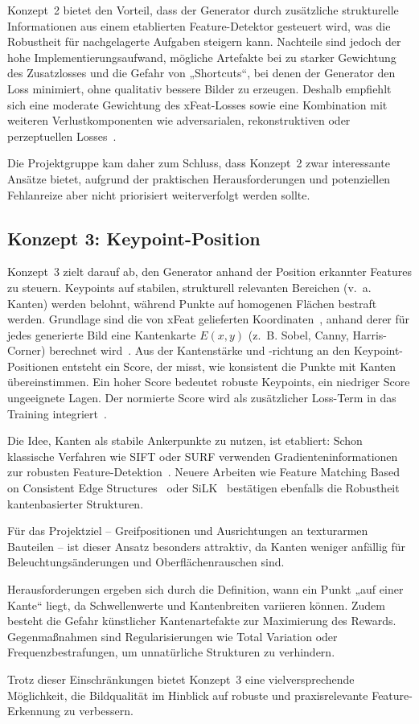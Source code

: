 Konzept~2 bietet den Vorteil, dass der Generator durch zusätzliche strukturelle Informationen aus einem etablierten Feature-Detektor gesteuert wird, was die Robustheit für nachgelagerte Aufgaben steigern kann. 
Nachteile sind jedoch der hohe Implementierungsaufwand, mögliche Artefakte bei zu starker Gewichtung des Zusatzlosses und die Gefahr von „Shortcuts“, bei denen der Generator den Loss minimiert, ohne qualitativ bessere Bilder zu erzeugen. 
Deshalb empfiehlt sich eine moderate Gewichtung des \ac{xFeat}-Losses sowie eine Kombination mit weiteren Verlustkomponenten wie adversarialen, rekonstruktiven oder perzeptuellen Losses~\cite{goodfellow2014gan,isola2018Pix2Pix}.  

Die Projektgruppe kam daher zum Schluss, dass Konzept~2 zwar interessante Ansätze bietet, aufgrund der praktischen Herausforderungen und potenziellen Fehlanreize aber nicht priorisiert weiterverfolgt werden sollte.

\subsection{Konzept 3: Keypoint-Position}
\label{sec:Konzept3}
Konzept~3 zielt darauf ab, den Generator anhand der Position erkannter Features zu steuern. 
Keypoints auf stabilen, strukturell relevanten Bereichen (v.~a. Kanten) werden belohnt, während Punkte auf homogenen Flächen bestraft werden. 
Grundlage sind die von \ac{xFeat} gelieferten Koordinaten~\cite{potje2024xfeat}, anhand derer für jedes generierte Bild eine Kantenkarte $E(x,y)$ (z.~B. Sobel, Canny, Harris-Corner) berechnet wird~\cite{szeliski2022}. 
Aus der Kantenstärke und -richtung an den Keypoint-Positionen entsteht ein Score, der misst, wie konsistent die Punkte mit Kanten übereinstimmen. 
Ein hoher Score bedeutet robuste Keypoints, ein niedriger Score ungeeignete Lagen. 
Der normierte Score wird als zusätzlicher Loss-Term in das Training integriert~\cite{chaumette2006visual,chaumette2007visual}.  

Die Idee, Kanten als stabile Ankerpunkte zu nutzen, ist etabliert: 
Schon klassische Verfahren wie \ac{SIFT} oder \ac{SURF} verwenden Gradienteninformationen zur robusten Feature-Detektion~\cite{lowe2004distinctive,bay2006surf}. 
Neuere Arbeiten wie Feature Matching Based on Consistent Edge Structures~\cite{mdpi2020edge} oder SiLK~\cite{gleize2023silk} bestätigen ebenfalls die Robustheit kantenbasierter Strukturen.  

Für das Projektziel – Greifpositionen und Ausrichtungen an texturarmen Bauteilen – ist dieser Ansatz besonders attraktiv, da Kanten weniger anfällig für Beleuchtungsänderungen und Oberflächenrauschen sind.  

Herausforderungen ergeben sich durch die Definition, wann ein Punkt „auf einer Kante“ liegt, da Schwellenwerte und Kantenbreiten variieren können. 
Zudem besteht die Gefahr künstlicher Kantenartefakte zur Maximierung des Rewards. 
Gegenmaßnahmen sind Regularisierungen wie Total Variation oder Frequenzbestrafungen, um unnatürliche Strukturen zu verhindern.  

Trotz dieser Einschränkungen bietet Konzept~3 eine vielversprechende Möglichkeit, die Bildqualität im Hinblick auf robuste und praxisrelevante Feature-Erkennung zu verbessern.
